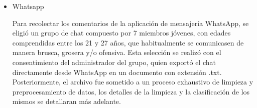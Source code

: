 \begin{itemize}
\item{Whatsapp}


Para recolectar los comentarios de la aplicación de mensajería WhatsApp, se eligió un grupo de chat compuesto por 7 miembros jóvenes, con edades comprendidas entre los 21 y 27 años, que habitualmente se comunicasen de manera brusca, grosera y/o ofensiva. Esta selección se realizó con el consentimiento del administrador del grupo, quien exportó el chat directamente desde WhatsApp en un documento con extensión .txt. Posteriormente, el archivo fue sometido a un proceso exhaustivo de limpieza y preprocesamiento de datos, los detalles de la limpieza y la clasificación de los mismos se detallaran más  adelante.

\end{itemize}




